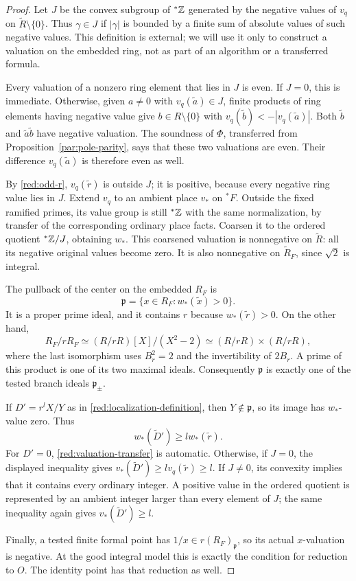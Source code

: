 \begin{proof}
Let $J$ be the convex subgroup of ${}^*\mathbb Z$ generated by the negative
values of $v_q$ on $\widetilde R\setminus\{0\}$. Thus $\gamma\in J$
if $|\gamma|$ is bounded by a finite sum of absolute values of such
negative values. This definition is external; we will use it only to
construct a valuation on the embedded ring, not as part of an algorithm
or a transferred formula.

Every valuation of a nonzero ring element that lies in $J$ is even.
If $J=0$, this is immediate.
Otherwise, given $a\ne0$ with $v_q(\widetilde a)\in J$, finite products
of ring elements having negative value give $b\in R\setminus\{0\}$
with
$v_q(\widetilde b)<-|v_q(\widetilde a)|$. Both $\widetilde b$ and
$\widetilde a\widetilde b$ have negative valuation. The soundness of
$\Phi$, transferred from Proposition~\ref{par:pole-parity}, says that
these two valuations are even. Their difference
$v_q(\widetilde a)$ is therefore even as well.

By \eqref{red:odd-r}, $v_q(\widetilde r)$ is outside $J$; it is
positive, because every negative ring value lies in $J$.
Extend $v_q$ to an ambient place $v_*$ on ${}^*F$. Outside the fixed
ramified primes, its value group is still ${}^*\mathbb Z$ with the same
normalization, by transfer of the corresponding ordinary place facts.
Coarsen it to the ordered quotient ${}^*\mathbb Z/J$, obtaining $w_*$.
This coarsened valuation is nonnegative on $\widetilde R$:
all its negative original values become zero. It is also nonnegative
on $\widetilde R_F$, since $\sqrt2$ is integral.

The pullback of the center on the embedded \(R_F\) is
\[
 \mathfrak p=\{x\in R_F:w_*(\widetilde x)>0\}.
\]
It is a proper prime ideal, and it contains $r$ because
$w_*(\widetilde r)>0$. On the other hand,
\[
 R_F/rR_F\simeq(R/rR)[X]/(X^2-2)
                         \simeq(R/rR)\times(R/rR),
\]
where the last isomorphism uses $B_r^2=2$ and the invertibility of
$2B_r$. A prime of this product is one of its two maximal ideals.
Consequently $\mathfrak p$ is exactly one of the tested branch ideals
$\mathfrak p_\pm$.

If $D'=r^l X/Y$ as in \eqref{red:localization-definition}, then
$Y\notin\mathfrak p$, so its image has $w_*$-value zero. Thus
\[
                       w_*(\widetilde D')\ge l w_*(\widetilde r).
\]
For $D'=0$, \eqref{red:valuation-transfer} is automatic. Otherwise,
if $J=0$, the displayed inequality gives
$v_*(\widetilde D')\ge l v_q(\widetilde r)\ge l$.
If $J\ne0$, its convexity implies that it contains every ordinary
integer. A positive value in the ordered quotient is represented by
an ambient integer larger than every element of $J$; the same inequality
again gives $v_*(\widetilde D')\ge l$.

Finally, a tested finite formal point has
$1/x\in r(R_F)_{\mathfrak p}$, so its actual $x$-valuation is
negative. At the good integral model this is exactly the condition
for reduction to $O$. The identity point has that reduction as well.
\end{proof}

